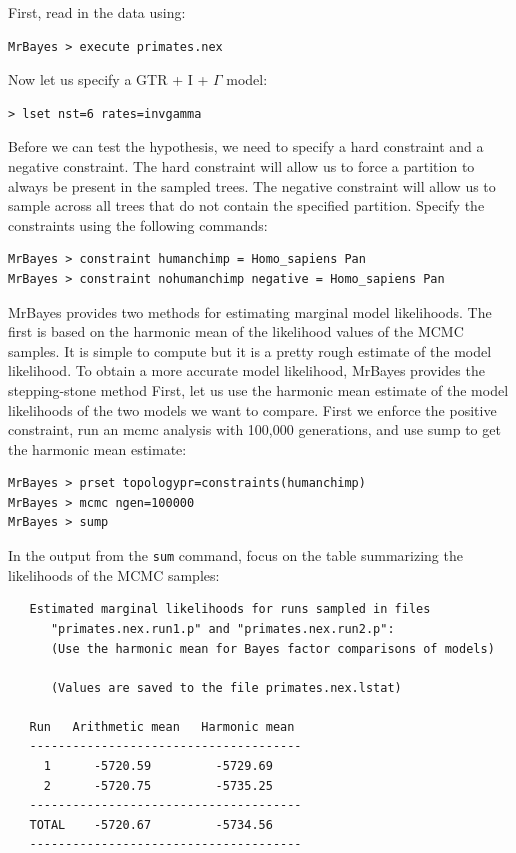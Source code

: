 \documentclass[12pt]{book}
\newcommand{\ttt}[1]{\texttt{#1} }
\begin{document}
First, read in the data using:

\begin{verbatim}
MrBayes > execute primates.nex
\end{verbatim}

Now let us specify a GTR + I + $\Gamma$ model:

\begin{verbatim}
> lset nst=6 rates=invgamma
\end{verbatim}

Before we can test the hypothesis, we need to specify a hard constraint and a negative constraint. The hard constraint
will allow us to force a partition to always be present in the sampled trees. The negative constraint will allow us to sample
across all trees that do not contain the specified partition. Specify the constraints using the following commands:

\begin{verbatim}
MrBayes > constraint humanchimp = Homo_sapiens Pan
MrBayes > constraint nohumanchimp negative = Homo_sapiens Pan
\end{verbatim}

MrBayes provides two methods for estimating marginal model likelihoods. The first is based on the harmonic mean of
the likelihood values of the MCMC samples. It is simple to compute but it is a pretty rough estimate of the model
likelihood. To obtain a more accurate model likelihood, MrBayes provides the stepping-stone method First, let us use the harmonic mean estimate of the model likelihoods of the two models we want to compare. First we enforce the positive constraint, run an mcmc analysis with 100,000 generations, and use sump to get the harmonic mean estimate:

\begin{singlespacing}
\begin{verbatim}
MrBayes > prset topologypr=constraints(humanchimp)
MrBayes > mcmc ngen=100000
MrBayes > sump
\end{verbatim}
\end{singlespacing}

In the output from the \ttt{sum} command, focus on the table summarizing the likelihoods of the MCMC samples:

\begin{singlespacing}
\begin{verbatim}
   Estimated marginal likelihoods for runs sampled in files
      "primates.nex.run1.p" and "primates.nex.run2.p":
      (Use the harmonic mean for Bayes factor comparisons of models)

      (Values are saved to the file primates.nex.lstat)

   Run   Arithmetic mean   Harmonic mean
   --------------------------------------
     1      -5720.59         -5729.69
     2      -5720.75         -5735.25
   --------------------------------------
   TOTAL    -5720.67         -5734.56
   --------------------------------------
\end{verbatim}
\end{singlespacing}
\end{document}
